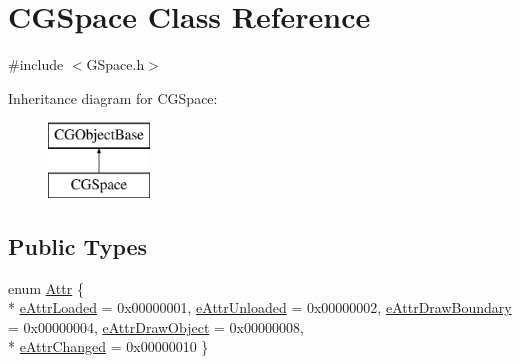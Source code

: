 \hypertarget{class_c_g_space}{}\section{C\+G\+Space Class Reference}
\label{class_c_g_space}


{\ttfamily \#include $<$G\+Space.\+h$>$}

Inheritance diagram for C\+G\+Space\+:\begin{figure}[H]
\begin{center}
\leavevmode
\includegraphics[height=2.000000cm]{class_c_g_space}
\end{center}
\end{figure}
\subsection*{Public Types}
\begin{DoxyCompactItemize}
\item 
enum \hyperlink{class_c_g_space_ad9e165bcfd44f2d483e7f3e045d6a3c3}{Attr} \{ \\*
\hyperlink{class_c_g_space_ad9e165bcfd44f2d483e7f3e045d6a3c3acf6bb79d895a7bb084b868d61019f197}{e\+Attr\+Loaded} = 0x00000001, 
\hyperlink{class_c_g_space_ad9e165bcfd44f2d483e7f3e045d6a3c3ad0d64c1abdd2fb7d03be8f0bd9f0678f}{e\+Attr\+Unloaded} = 0x00000002, 
\hyperlink{class_c_g_space_ad9e165bcfd44f2d483e7f3e045d6a3c3ac5ff0b3729c7cd9aaf56b9581e2f8d64}{e\+Attr\+Draw\+Boundary} = 0x00000004, 
\hyperlink{class_c_g_space_ad9e165bcfd44f2d483e7f3e045d6a3c3a90afdb5a93fd313eb4b80ae4cb99ac53}{e\+Attr\+Draw\+Object} = 0x00000008, 
\\*
\hyperlink{class_c_g_space_ad9e165bcfd44f2d483e7f3e045d6a3c3a4e720f22aecd65dd17794988b0a818af}{e\+Attr\+Changed} = 0x00000010
 \}
\end{DoxyCompactItemize}
